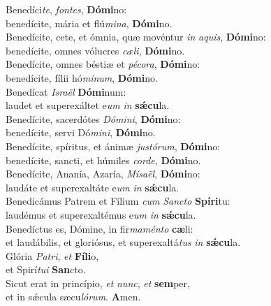 \evenverse Benedíci\textit{te}, \textit{fon}\textit{tes}, \textbf{Dó}\textbf{mi}no:~\*\\
\evenverse benedícite, mária et flú\textit{mi}\textit{na}, \textbf{Dó}\textbf{mi}no.\\
\oddverse Benedícite, cete, et ómnia, quæ movéntur \textit{in} \textit{a}\textit{quis}, \textbf{Dó}\textbf{mi}no:~\*\\
\oddverse benedícite, omnes vólucres \textit{cæ}\textit{li}, \textbf{Dó}\textbf{mi}no.\\
\evenverse Benedícite, omnes béstiæ et \textit{pé}\textit{co}\textit{ra}, \textbf{Dó}\textbf{mi}no:~\*\\
\evenverse benedícite, fílii hó\textit{mi}\textit{num}, \textbf{Dó}\textbf{mi}no.\\
\oddverse Benedícat \textit{Is}\textit{ra}\textit{ël} \textbf{Dó}\textbf{mi}num:~\*\\
\oddverse laudet et superexáltet e\textit{um} \textit{in} \textbf{sǽ}\textbf{cu}la.\\
\evenverse Benedícite, sacerdótes \textit{Dó}\textit{mi}\textit{ni}, \textbf{Dó}\textbf{mi}no:~\*\\
\evenverse benedícite, servi Dó\textit{mi}\textit{ni}, \textbf{Dó}\textbf{mi}no.\\
\oddverse Benedícite, spíritus, et ánimæ \textit{ju}\textit{stó}\textit{rum}, \textbf{Dó}\textbf{mi}no:~\*\\
\oddverse benedícite, sancti, et húmiles \textit{cor}\textit{de}, \textbf{Dó}\textbf{mi}no.\\
\evenverse Benedícite, Ananía, Azaría, \textit{Mí}\textit{sa}\textit{ël}, \textbf{Dó}\textbf{mi}no:~\*\\
\evenverse laudáte et superexaltáte e\textit{um} \textit{in} \textbf{sǽ}\textbf{cu}la.\\
\oddverse Benedicámus Patrem et Fílium \textit{cum} \textit{San}\textit{cto} \textbf{Spí}\textbf{ri}tu:~\*\\
\oddverse laudémus et superexaltémus e\textit{um} \textit{in} \textbf{sǽ}\textbf{cu}la.\\
\evenverse Benedíctus es, Dómine, in fir\textit{ma}\textit{mén}\textit{to} \textbf{cæ}li:~\*\\
\evenverse et laudábilis, et gloriósus, et superexaltá\textit{tus} \textit{in} \textbf{sǽ}\textbf{cu}la.\\
\oddverse Glória \textit{Pa}\textit{tri}, \textit{et} \textbf{Fí}\textbf{li}o,~\*\\
\oddverse et Spirí\textit{tu}\textit{i} \textbf{San}cto.\\
\evenverse Sicut erat in princípio, \textit{et} \textit{nunc}, \textit{et} \textbf{sem}per,~\*\\
\evenverse et in sǽcula sæcu\textit{ló}\textit{rum}. \textbf{A}men.\\
